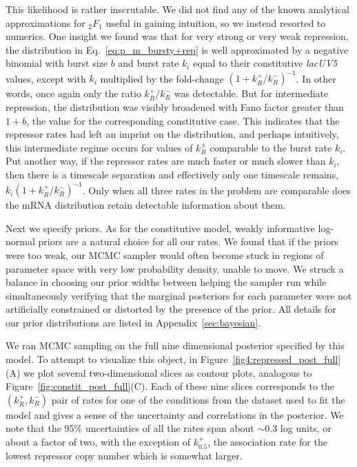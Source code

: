 This likelihood is rather inscrutable. We did not find any of the known
analytical approximations for ${_2F_1}$ useful in gaining intuition, so we
instead resorted to numerics. One insight we found was that for very strong or
very weak repression, the distribution in Eq.~\ref{eq:p_m_bursty+rep} is well
approximated by a negative binomial with burst size $b$ and burst rate $k_i$
equal to their constitutive \textit{lacUV5} values, except with $k_i$ multiplied
by the fold-change $\left(1+k_R^+/k_R^-\right)^{-1}$. In other words, once again
only the ratio $k_R^+/k_R^-$ was detectable. But for intermediate repression,
the distribution was visibly broadened with Fano factor greater than $1+b$, the
value for the corresponding constitutive case. This indicates that the repressor
rates had left an imprint on the distribution, and perhaps intuitively, this
intermediate regime occurs for values of $k_R^\pm$ comparable to the burst rate
$k_i$. Put another way, if the repressor rates are much faster or much slower
than $k_i$, then there is a timescale separation and effectively only one
timescale remains, $k_i\left(1+k_R^+/k_R^-\right)^{-1}$. Only when all three
rates in the problem are comparable does the mRNA distribution retain detectable
information about them.

Next we specify priors. As for the constitutive model, weakly informative
log-normal priors are a natural choice for all our rates. We found that if the
priors were too weak, our MCMC sampler would often become stuck in regions of
parameter space with very low probability density, unable to move. We struck a
balance in choosing our prior widths between helping the sampler run while
simultaneously verifying that the marginal posteriors for each parameter were
not artificially constrained or distorted by the presence of the prior.
All details for our prior distributions are listed in 
Appendix~\ref{sec:bayesian}.

We ran MCMC sampling on the full nine dimensional posterior specified by this
model. To attempt to visualize this object, in
Figure~\ref{fig4:repressed_post_full}(A) we plot several two-dimensional slices
as contour plots, analogous to Figure~\ref{fig:constit_post_full}(C). Each of
these nine slices corresponds to the $(k_R^+, k_R^-)$ pair of rates for one of
the conditions from the dataset used to fit the model and gives a
sense of the uncertainty and correlations in the posterior.
We note that the 95\% uncertainties of all the rates span about $\sim0.3$
log units, or about a factor of two, with the exception of $k_{0.5}^+$, the
association rate for the lowest repressor copy number which is somewhat larger.


